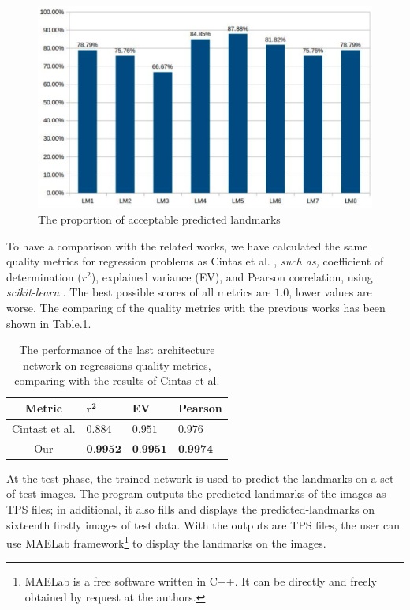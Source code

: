 \documentclass[conference]{IEEEtran}
\begin{document}
\begin{figure}[htbp]
	\centerline{\includegraphics[scale=0.2]{images/chart.eps}}
	\caption{The proportion of acceptable predicted landmarks}
	\label{figchart}
\end{figure}

To have a comparison with the related works, we have calculated the same quality metrics for regression problems as Cintas et al. \cite{cintas2016automatic}, \textit{such as,} coefficient of determination ($r^2$), explained variance (EV), and Pearson correlation, using \textit{scikit-learn} \cite{pedregosa2011scikit}. The best possible scores of all metrics are $1.0$, lower values are worse. The comparing of the quality metrics with the previous works has been shown in Table.\ref{tab3}.

\begin{table}[htbp]
\centering
\caption{The performance of the last architecture network on regressions quality metrics, comparing with the results of Cintas et al. \cite{cintas2016automatic}}
\begin{center}
\begin{tabular}{|c|p{1cm}|p{1cm}|p{1cm}|}
\hline
Metric & $\mathbf{r^{2}}$ & \textbf{EV} & \textbf{Pearson} \\ \hline
Cintast et al. \cite{cintas2016automatic} & $0.884$ & $0.951$ & $0.976$ \\ \hline
Our & $\textbf{0.9952}$ & $\textbf{0.9951}$ & $\textbf{0.9974}$ \\ \hline
\end{tabular}
\label{tab3}
\end{center}
\end{table}
At the test phase, the trained network is used to predict the landmarks on a set of test images. The program outputs the predicted-landmarks of the images as TPS files; in additional, it also fills and displays the predicted-landmarks on sixteenth firstly images of test data. With the outputs are TPS files, the user can use MAELab \cite{le2017maelab} framework\footnote{MAELab is a free software written in C++. It can be directly
and freely obtained by request at the authors.} to display the landmarks on the images.
\end{document}
